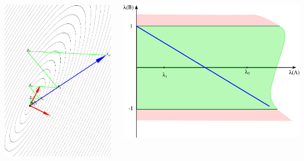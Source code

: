 \documentclass[professionalfonts,compress,unicode]{beamer}
\begin{document}
{
\begin{columns}
\begin{column}{0.5\textwidth}
\includegraphics[width=\columnwidth]{si0_40.pdf}%
\end{column}
\begin{column}{0.5\textwidth}
\includegraphics[width=\columnwidth]{lAlB0_40.pdf}%
\end{column}
\end{columns}
}
\end{document}
